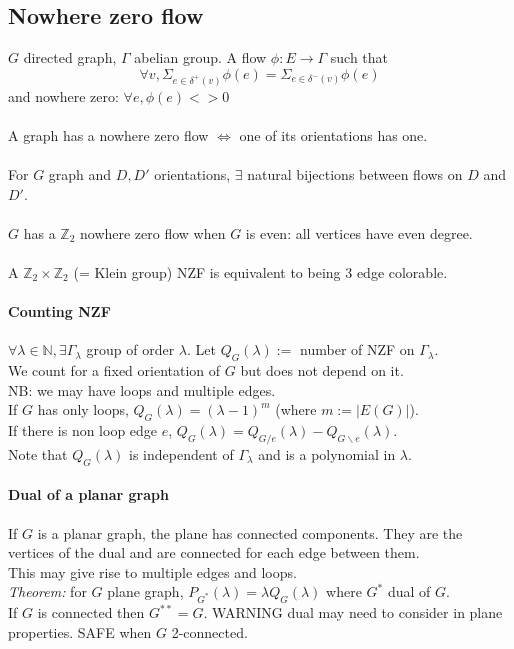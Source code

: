 \documentclass[12pt]{article}
\begin{document}
\subsection{Nowhere zero flow}
$G$ directed graph, $\Gamma$ abelian group. A flow $\phi : E \rightarrow \Gamma$ such that
\[ \forall v, \Sigma_{e \in \delta^+(v)} \phi(e) = \Sigma_{e \in \delta^-(v)} \phi(e) \]
and nowhere zero: $\forall e, \phi(e) <> 0$\\\\

A graph has a nowhere zero flow $\Leftrightarrow$ one of its orientations has one.\\\\

For $G$ graph and $D,D'$ orientations, $\exists$ natural bijections between flows on $D$ and $D'$.\\\\

$G$ has a $\mathbb{Z}_2$ nowhere zero flow when $G$ is even: all vertices have even degree.\\\\

A $\mathbb{Z}_2 \times \mathbb{Z}_2$ (= Klein group) NZF is equivalent to being 3 edge colorable.\\

\paragraph{Counting NZF\\}
$\forall \lambda \in \mathbb{N}, \exists \Gamma_\lambda$ group of order $\lambda$. Let $Q_G(\lambda) :=$ number of NZF on $\Gamma_\lambda$.\\
We count for a fixed orientation of $G$ but does not depend on it.\\
NB: we may have loops and multiple edges.\\
If $G$ has only loops, $Q_G(\lambda) = (\lambda-1)^m$ (where $m := |E(G)|$).\\
If there is non loop edge $e$, $Q_G(\lambda) = Q_{G/e}(\lambda) - Q_{G \backslash e}(\lambda)$.\\
Note that $Q_G(\lambda)$ is independent of $\Gamma_\lambda$ and is a polynomial in $\lambda$.\\

\paragraph{Dual of a planar graph\\}
If $G$ is a planar graph, the plane has connected components. They are the vertices of the dual and are connected for each edge between them.\\
This may give rise to multiple edges and loops.\\
\emph{Theorem:} for $G$ plane graph, $P_{G^*}(\lambda) = \lambda Q_G(\lambda)$ where $G^*$ dual of $G$.\\
If $G$ is connected then $G^{**} = G$. WARNING dual may need to consider in plane properties. SAFE when $G$ 2-connected.\\\\
\end{document}
